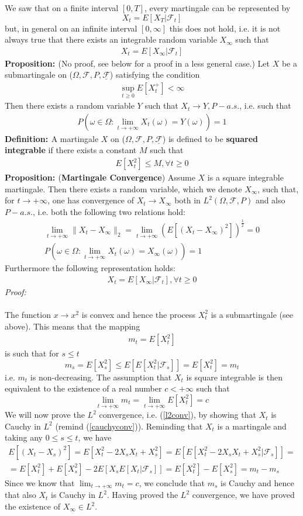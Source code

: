 \documentclass[a4paper,10pt]{report}
\theoremstyle{plain}
\theoremstyle{definition}
\newcommand\be{\begin{eqnarray}}    %
\newcommand\ee{\end{eqnarray}}
\newcommand{\DEF} {{\bf{Definition: }}}
\newcommand{\PROP} {{\bf{Proposition: }}}
\newcommand{\PROOF} {{\emph{Proof: \\ \\}}}
\newcommand{\FF} {\mathcal{F} }
\newcommand{\FLT} {\underline{\mathcal{F}}}
\begin{document}
We saw that on a finite interval $[0,T]$, every martingale can be represented by
\[
X_t=E[X_T|\FF_t]
\]
but, in general on an infinite interval $[0,\infty]$ this does not hold, i.e. it is not always true that there exists
an integrable random variable $X_\infty$ such that
\be
X_t=E[X_\infty|\FF_t]
\ee
\PROP (No proof, see below for a proof in a less general case.) Let $X$ be a submartingale on ($\Omega, \FF, P, \FLT$) satisfying the condition
\be 
\sup_{t\geq 0} E[X_t^+]<\infty
\ee
Then there exists a random variable $Y$ such that $X_t\rightarrow Y, P-a.s.$, i.e. such that
\be
P\left(\omega\in \Omega :\lim_{t\rightarrow +\infty} X_t(\omega)=Y(\omega) \right)=1
\label{pconvsuper}
\ee
\DEF A martingale $X$ on ($\Omega, \FF, P, \FLT$) is defined to be {\bf{squared integrable}} if there exists a constant $M$ such that
\be 
E[X_t^2]\leq M, \forall t\geq 0
\ee
\PROP ({\bf{Martingale Convergence}}) Assume $X$ is a square integrable martingale. Then there exists a random variable, which we denote $X_\infty$, such that, for $t\rightarrow +\infty$, one has convergence of  $X_t\rightarrow X_\infty$ both in $L^2(\Omega, \FF, P)$ and also $P-a.s.$, i.e. both the following two relations hold:
\be
\lim_{t\rightarrow +\infty} \| X_t-X_\infty \|_2= \lim_{t\rightarrow +\infty} \left(  E[(X_t-X_\infty)^2] \right)^{\frac{1}{2}}=0 \label{l2conv}\\
P\left(\omega\in \Omega :\lim_{t\rightarrow +\infty} X_t(\omega)=X_\infty(\omega) \right)=1
\label{pconv}
\ee
Furthermore the following representation holds:
\be 
X_t=E[X_\infty|\FF_t], \forall t\geq 0
\label{mrepr}
\ee
\PROOF
The function $x\rightarrow x^2$ is convex and hence the process $X_t^2$ is a submartingale (see above). This means that the mapping
\be
m_t=E[X_t^2]
\ee
is such that for $s\leq t$
\[
m_s=E[X_s^2]\leq E[E[X_t^2|\FF_s]]=E[X_t^2]=m_t
\]
i.e. $m_t$ is non-decreasing.
The assumption that $X_t$ is square integrable is then equivalent to the existence of a real number $c<+\infty$ such that 
\[
\lim_{t\rightarrow +\infty}m_t=\lim_{t\rightarrow +\infty}E[X_t^2]=c
\]
We will now prove the $L^2$ convergence, i.e. (\ref{l2conv}), by showing that $X_t$ is Cauchy in $L^2$ (remind (\ref{cauchyconv})). Reminding that $X_t$ is a martingale and taking any $0\leq s \leq t$, we have
\be 
E[(X_t-X_s)^2]=E[X_t^2-2X_s X_t+X_s^2]=E[E[X_t^2-2X_s X_t+X_s^2|\FF_s]]=\\
=E[X_t^2]+E[X_s^2]-2E[X_sE[X_t|\FF_s]]=E[X_t^2]-E[X_s^2]=m_t-m_s
\ee
Since we know that $\lim_{t\rightarrow +\infty}m_t=c$, we conclude that $m_s$ is Cauchy and hence that also $X_t$ is Cauchy in $L^2$. Having proved the $L^2$ convergence, we have proved the existence of $X_\infty\in L^2$. 
\end{document}
